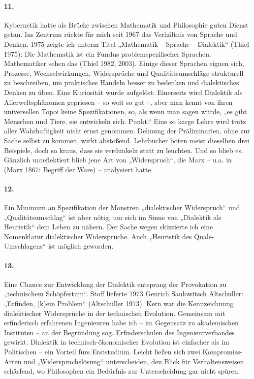 \documentclass[a4paper,11pt]{article}
\begin{document}
\paragraph{11.}
Kybernetik hatte als Brücke zwischen Mathematik und Philosophie guten Dienst
getan. Ins Zentrum rückte für mich seit 1967 das Verhältnis von Sprache und
Denken.  1975 zeigte ich unterm Titel „Mathematik – Sprache – Dialektik“
(Thiel 1975): Die Mathematik ist ein Fundus problemspezifischer Sprachen.
Mathematiker sehen das (Thiel 1982, 2003). Einige dieser Sprachen eignen sich,
Prozesse, Wechselwirkungen, Widersprüche und Qualitätsumschläge strukturell zu
beschreiben, um praktisches Handeln besser zu bedenken und dialektisches
Denken zu üben. Eine Kuriosität wurde aufgelöst: Einerseits wird Dialektik als
Allerweltsphänomen gepriesen – so weit so gut --, aber man kennt von ihren
universellen Topoi keine Spezifikationen, so, als wenn man sagen würde, „es
gibt Menschen und Tiere, sie entwickeln sich. Punkt.“ Eine so karge Lehre wird
trotz aller Wahrhaftigkeit nicht ernst genommen. Dehnung der Präliminarien,
ohne zur Sache selbst zu kommen, wirkt abstoßend. Lehrbücher boten meist
dieselben drei Beispiele, doch so kraus, dass sie verdunkeln statt zu
leuchten.  Und so blieb es. Gänzlich unreflektiert blieb jene Art von
„Widerspruch“, die Marx -- u.a. in (Marx 1867: Begriff der Ware) -- analysiert
hatte.

\paragraph{12.}
Ein Minimum an Spezifikation der Monstren „dialektischer Widerspruch“ und
„Qualitätsumschlag“ ist aber nötig, um sich im Sinne von „Dialektik als
Heuristik“ dem Leben zu nähern. Der Sache wegen skizzierte ich eine
Nomenklatur dialektischer Widersprüche. Auch „Heuristik des Quale-Umschlagens“
ist möglich geworden.

\paragraph{13.}
Eine Chance zur Entwicklung der Dialektik entsprang der Provokation zu
„technischem Schöpfertum“. Stoff lieferte 1973 Genrich Saulowitsch
Altschuller: „Erfinden, (k)ein Problem“ (Altschuller 1973). Kern war die
Kennzeichnung dialektischer Widersprüche in der technischen Evolution.
Gemeinsam mit erfinderisch erfahrenen Ingenieuren habe ich – im Gegensatz zu
akademischen Instituten – an der Begründung sog. Erfinderschulen des
Ingenieurverbandes gewirkt. Dialektik in technisch-ökonomischer Evolution ist
einfacher als im Politischen -- ein Vorteil fürs Erststudium. Leicht ließen
sich zwei Kompromiss-Arten und „Widerspruchslösung“ unterscheiden, den Blick
für Verhaltensweisen schärfend, wo Philosophen ein Bedürfnis zur
Unterscheidung gar nicht spüren.
\end{document}
